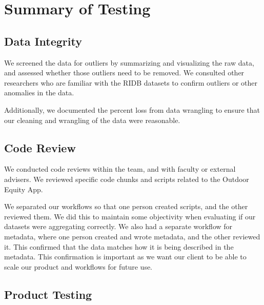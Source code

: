 \documentclass[
  11 pt,
  openany]{book}
\begin{document}
\hypertarget{summary-of-testing}{%
\chapter{Summary of Testing}\label{summary-of-testing}}

\hypertarget{data-integrity}{%
\section{Data Integrity}\label{data-integrity}}

We screened the data for outliers by summarizing and visualizing the raw data, and assessed whether those outliers need to be removed. We consulted other researchers who are familiar with the RIDB datasets to confirm outliers or other anomalies in the data.

Additionally, we documented the percent loss from data wrangling to ensure that our cleaning and wrangling of the data were reasonable.

\hypertarget{code-review}{%
\section{Code Review}\label{code-review}}

We conducted code reviews within the team, and with faculty or external advisers. We reviewed specific code chunks and scripts related to the Outdoor Equity App.

We separated our workflows so that one person created scripts, and the other reviewed them. We did this to maintain some objectivity when evaluating if our datasets were aggregating correctly. We also had a separate workflow for metadata, where one person created and wrote metadata, and the other reviewed it. This confirmed that the data matches how it is being described in the metadata. This confirmation is important as we want our client to be able to scale our product and workflows for future use.

\hypertarget{product-testing}{%
\section{Product Testing}\label{product-testing}}
\end{document}
